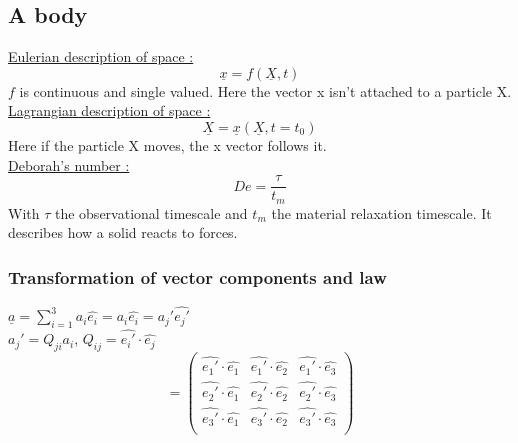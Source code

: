 \documentclass[../main.tex]{subfiles}
\begin{document}
\localtableofcontents
\subsection{A body}
\quad \underline{Eulerian description of space :}\\
\begin{equation}
    \underline{x} = f(\underline{X}, t)
\end{equation}
$f$ is continuous and single valued. Here the vector x isn't attached to a particle X.\\

\quad \underline{Lagrangian description of space :}\\
\begin{equation}
    \underline{X} = \underline{x}(\underline{X}, t=t_0)
\end{equation}
Here if the particle X moves, the x vector follows it.\\

\quad \underline{Deborah's number :} \\
\begin{equation}
    De = \frac{\tau}{t_m}
\end{equation}
With $\tau$ the observational timescale and $t_m$ the material relaxation timescale. It describes how a solid reacts to forces.\\

\subsubsection{Transformation of vector components and law}
$\underline{a} = \sum_{i=1}^3 a_i \hat{e_i} = a_i \hat{e_i} = a_j' \hat{e_j'}$\\
$a_j' = Q_{ji} a_i$, $Q_{ij} = \hat{e_i'}\cdot \hat{e_j}$\\
\begin{equation}
    [\underline{\underline{Q}}] = \begin{pmatrix}
        \hat{e_1'}\cdot \hat{e_1} & \hat{e_1'}\cdot \hat{e_2} & \hat{e_1'}\cdot \hat{e_3}\\
        \hat{e_2'}\cdot \hat{e_1} & \hat{e_2'}\cdot \hat{e_2} & \hat{e_2'}\cdot \hat{e_3}\\
        \hat{e_3'}\cdot \hat{e_1} & \hat{e_3'}\cdot \hat{e_2} & \hat{e_3'}\cdot \hat{e_3}\\
    \end{pmatrix}
\end{equation}
\end{document}
